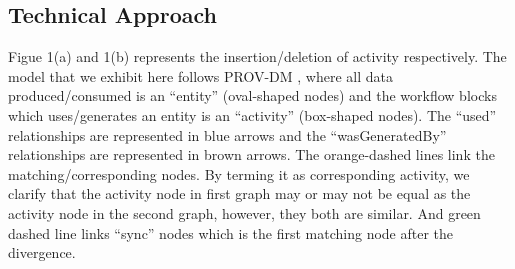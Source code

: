 \documentclass[10pt,conference,twocolumn]{IEEEtran}
\begin{document}
\subsection{Technical Approach}
Figue 1(a) and 1(b) represents the insertion/deletion of activity respectively. The model that we exhibit here follows PROV-DM \cite{ProvDM}, where all data produced/consumed is an \enquote{entity} (oval-shaped nodes) and the workflow blocks which uses/generates an entity is an \enquote{activity} (box-shaped nodes). The \enquote{used} relationships are represented in blue arrows and the \enquote{wasGeneratedBy} relationships are represented in brown arrows. The orange-dashed lines link the matching/corresponding nodes. By terming it as corresponding activity, we clarify that the activity node in first graph may or may not be equal as the activity node in the second graph, however, they both are similar.  And green dashed line links \enquote{sync} nodes which is the first matching node after the divergence.  
\end{document}
